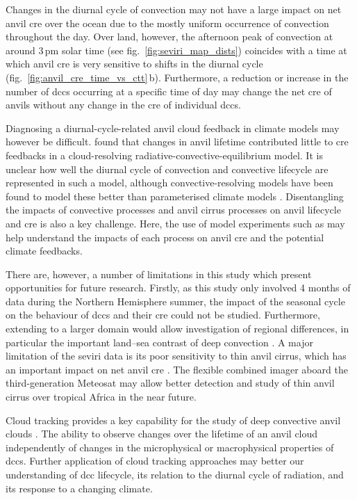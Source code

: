 Changes in the diurnal cycle of convection may not have a large impact on net anvil \acrshort{cre} over the ocean due to the mostly uniform occurrence of convection throughout the day.
Over land, however, the afternoon peak of convection at around 3\,pm solar time (see fig.~\ref{fig:seviri_map_dists}) coincides with a time at which anvil \acrshort{cre} is very sensitive to shifts in the diurnal cycle (fig.~\ref{fig:anvil_cre_time_vs_ctt}\,b).
Furthermore, a reduction or increase in the number of \acrshort{dcc}s occurring at a specific time of day may change the net \acrshort{cre} of anvils without any change in the \acrshort{cre} of individual \acrshort{dcc}s.

Diagnosing a diurnal-cycle-related anvil cloud feedback in climate models may however be difficult.
\citet{beydoun_dissecting_2021} found that changes in anvil lifetime contributed little to \acrshort{cre} feedbacks in a cloud-resolving radiative-convective-equilibrium model.
It is unclear how well the diurnal cycle of convection and convective lifecycle are represented in such a model, although convective-resolving models have been found to model these better than parameterised climate models \citep{prein_review_2015, feng_mesoscale_2023}.
Disentangling the impacts of convective processes and anvil cirrus processes on anvil lifecycle and \acrshort{cre} is also a key challenge.
Here, the use of model experiments such as \citet{gasparini_diurnal_2022} may help understand the impacts of each process on anvil \acrfull{cre} and the potential climate feedbacks.

There are, however, a number of limitations in this study which present opportunities for future research. 
Firstly, as this study only involved 4 months of data during the Northern Hemisphere summer, the impact of the seasonal cycle on the behaviour of \acrshort{dcc}s and their \acrshort{cre} could not be studied. 
Furthermore, extending to a larger domain would allow investigation of regional differences, in particular the important land--sea contrast of deep convection \citep{takahashi_revisiting_2023}. 
A major limitation of the \acrshort{seviri} data is its poor sensitivity to thin anvil cirrus, which has an important impact on net anvil \acrshort{cre} \citep{protopapadaki_upper_2017, horner_evolution_2023}.
The flexible combined imager \citep{martin_fci_2021} aboard the third-generation Meteosat may allow better detection and study of thin anvil cirrus over tropical Africa in the near future.

Cloud tracking provides a key capability for the study of deep convective anvil clouds \citep{gasparini_opinion_2023}.
The ability to observe changes over the lifetime of an anvil cloud independently of changes in the microphysical or macrophysical properties of \acrshort{dcc}s.
Further application of cloud tracking approaches may better our understanding of \acrshort{dcc} lifecycle, its relation to the diurnal cycle of radiation, and its response to a changing climate.
